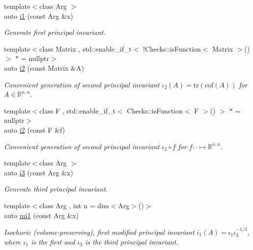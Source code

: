 \begin{DoxyCompactItemize}
{\footnotesize template$<$class Arg $>$ }\\auto \hyperlink{group__InvariantGroup_gafaead59b618d87239270f8eca2bf75c8}{i1} (const \-Arg \&x)
\begin{DoxyCompactList}\small\item\em \-Generate first principal invariant. \end{DoxyCompactList}\item 
{\footnotesize template$<$class Matrix , std\-::enable\-\_\-if\-\_\-t$<$ !\-Checks\-::is\-Function$<$ Matrix $>$() $>$ $\ast$  = nullptr$>$ }\\auto \hyperlink{group__InvariantGroup_ga9e442bab8f203bcd5634a3d0e65bf802}{i2} (const \-Matrix \&\-A)
\begin{DoxyCompactList}\small\item\em \-Convenient generation of second principal invariant $ \iota_2(A)=\mathrm{tr}(\mathrm{cof}(A)) $ for $A\in\mathbb{R}^{n,n}$. \end{DoxyCompactList}\item 
{\footnotesize template$<$class F , std\-::enable\-\_\-if\-\_\-t$<$ Checks\-::is\-Function$<$ F $>$() $>$ $\ast$  = nullptr$>$ }\\auto \hyperlink{group__InvariantGroup_gad3987f97353c8696e602ed1915b3cf47}{i2} (const \-F \&f)
\begin{DoxyCompactList}\small\item\em \-Convenient generation of second principal invariant $ \iota_2\circ f $ for $f:\cdot\mapsto\mathbb{R}^{n,n}$. \end{DoxyCompactList}\item 
{\footnotesize template$<$class Arg $>$ }\\auto \hyperlink{group__InvariantGroup_gae1ad80b4b2f34a10564114fad28bc313}{i3} (const \-Arg \&x)
\begin{DoxyCompactList}\small\item\em \-Generate third principal invariant. \end{DoxyCompactList}\item 
{\footnotesize template$<$class Arg , int n = dim$<$\-Arg$>$()$>$ }\\auto \hyperlink{group__InvariantGroup_ga7eed5e2661171d81e192ac1db791244c}{mi1} (const \-Arg \&x)
\begin{DoxyCompactList}\small\item\em \-Isochoric (volume-\/preserving), first modified principal invariant $ \bar\iota_1(A)=\iota_1\iota_3^{-1/3} $, where $\iota_1$ is the first and $\iota_3$ is the third principal invariant. \end{DoxyCompactList}\item 

\end{DoxyCompactItemize}

